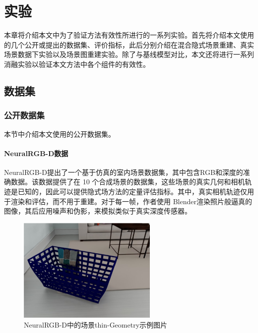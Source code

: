 \chapter{实验}
\label{chapter: exp}
本章将介绍本文中为了验证方法有效性所进行的一系列实验。首先将介绍本文使用的几个公开或提出的数据集、评价指标，此后分别介绍在混合隐式场景重建、真实场景数据下实验以及场景图重建实验。除了与基线模型对比，本文还将进行一系列消融实验以验证本文方法中各个组件的有效性。


\section{数据集}
\subsection{公开数据集}
本节中介绍本文使用的公开数据集。
\subsubsection{NeuralRGB-D数据}
NeuralRGB-D\cite{azinovic_neural_2022}提出了一个基于仿真的室内场景数据集，其中包含RGB和深度的准确数据。该数据提供了在 10 个合成场景的数据集，这些场景的真实几何和相机轨迹是已知的，因此可以提供隐式场方法的定量评估指标。其中，真实相机轨迹仅用于渲染和评估，而不用于重建。对于每一帧，作者使用 Blender渲染照片般逼真的图像，其后应用噪声和伪影，来模拟类似于真实深度传感器\cite{zabatani_intel_2020, zhang_microsoft_2012}。

\begin{figure}[ht]
    \centering
    \includegraphics[width=0.6\textwidth]{undergraduate-thesis/images/experiments/neural-rgbd dataset.png}
    \caption{NeuralRGB-D\cite{azinovic_neural_2022}中的场景thin-Geometry示例图片}
    \label{fig:exp-neural-rgbd-data}
\end{figure}

